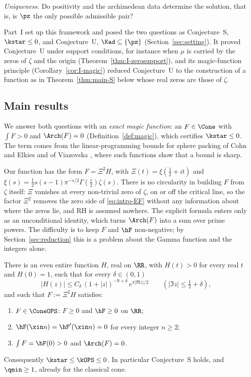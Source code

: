 \emph{Uniqueness.} Do positivity and the archimedean data determine the solution, that is, is $\pz$ the only possible admissible pair?

Part~I \cite{Joh26} set up this framework and posed the two questions as Conjecture~S, $\kstar\le0$, and Conjecture~U, $\Kad\subseteq\{\pz\}$
(Section~\ref{sec:setting}). It proved Conjecture~U under support conditions, for instance when $\mu$ is carried by the zeros of $\zeta$ and
the origin (Theorem~\ref{thm:I-zerosupport}), and its magic-function principle (Corollary~\ref{cor:I-magic}) reduced Conjecture~U to the
construction of a function as in Theorem~\ref{thm:main-S} below whose real zeros are those of $\zeta$.

\subsection{Main results}

We answer both questions with an \emph{exact magic function}: an $F\in\Cone$ with $\int F>0$ and $\Arch(F)=0$
(Definition~\ref{def:magic}), which certifies $\kstar\le0$. The term comes from the linear-programming bounds for sphere packing of Cohn and
Elkies and of Viazovska \cite{CE03,Via17}, where such functions show that a bound is sharp.

Our function has the form $F=\Xi^2H$, with $\Xi(t)=\xi(\frac12+it)$ and $\xi(s)=\frac12s(s-1)\pi^{-s/2}\Gamma(\frac s2)\zeta(s)$. There is no
circularity in building $F$ from $\zeta$ itself: $\Xi$ vanishes at every non-trivial zero of $\zeta$, on or off the critical line, so the
factor $\Xi^2$ removes the zero side of \eqref{eq:intro-EF} without any information about where the zeros lie, and RH is assumed nowhere. The
explicit formula enters only as an unconditional identity, which turns $\Arch(F)$ into a sum over prime powers. The difficulty is to keep $F$
and $\hF$ non-negative; by Section~\ref{sec:reduction} this is a problem about the Gamma function and the integers alone.

\begin{mainthm}\label{thm:main-S}
There is an even entire function $H$, real on $\RR$, with $H(t)>0$ for every real $t$ and $H(0)=1$, such that for every $\delta\in(0,1)$
\begin{equation}\label{eq:intro-C1}
|H(z)|\le C_\delta\,(1+|z|)^{-9+\delta}\,e^{\pi|\Re z|/2}\qquad(|\Im z|\le\tfrac12+\delta),
\end{equation}
and such that $F:=\Xi^2H$ satisfies:
\begin{enumerate}[label=\textup{(\alph*)}]
\item $F\in\ConeOPS$: $F\ge0$ and $\hF\ge0$ on $\RR$;
\item $\hF(\xin n)=\hF'(\xin n)=0$ for every integer $n\ge2$;
\item $\int F=\hF(0)>0$ and $\Arch(F)=0$.
\end{enumerate}
Consequently $\kstar\le\kOPS\le0$. In particular Conjecture~S holds, and $\qmin\ge1$, already for the classical cone.
\end{mainthm}

